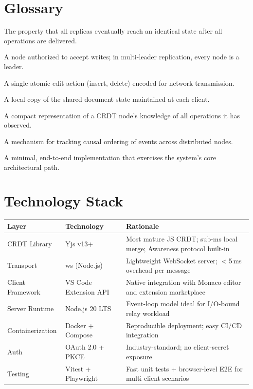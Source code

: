 \documentclass[12pt, a4paper, oneside]{article}
\begin{document}
\section{Glossary}
\begin{description}[style=nextline, leftmargin=3cm]
  \item[Convergence] The property that all replicas eventually reach an identical state after all operations are delivered.
  \item[Leader] A node authorized to accept writes; in multi-leader replication, every node is a leader.
  \item[Operation (Op)] A single atomic edit action (insert, delete) encoded for network transmission.
  \item[Replica] A local copy of the shared document state maintained at each client.
  \item[State Vector] A compact representation of a CRDT node's knowledge of all operations it has observed.
  \item[Vector Clock] A mechanism for tracking causal ordering of events across distributed nodes.
  \item[Walking Skeleton] A minimal, end-to-end implementation that exercises the system's core architectural path.
\end{description}

\appendix
\section{Technology Stack}
\begin{table}[H]
\centering
\begin{tabularx}{\textwidth}{l l X}
\toprule
\textbf{Layer} & \textbf{Technology} & \textbf{Rationale} \\
\midrule
CRDT Library & Yjs v13+ & Most mature JS CRDT; sub-ms local merge; Awareness protocol built-in \\
Transport & ws (Node.js) & Lightweight WebSocket server; $<$5\,ms overhead per message \\
Client Framework & VS Code Extension API & Native integration with Monaco editor and extension marketplace \\
Server Runtime & Node.js 20 LTS & Event-loop model ideal for I/O-bound relay workload \\
Containerization & Docker + Compose & Reproducible deployment; easy CI/CD integration \\
Auth & OAuth 2.0 + PKCE & Industry-standard; no client-secret exposure \\
Testing & Vitest + Playwright & Fast unit tests + browser-level E2E for multi-client scenarios \\
\bottomrule
\end{tabularx}
\end{table}
\end{document}
